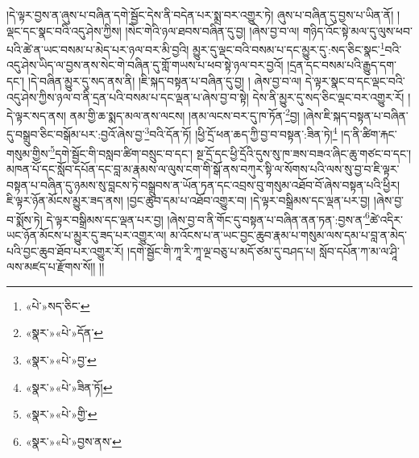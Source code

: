 །དེ་ལྟར་བྱས་ན་ཞུས་པ་བཞིན་དགེ་སྦྱོང་དེས་ནི་བདེན་པར་སྨྲ་བར་འགྱུར་ཏེ། ཞུས་པ་བཞིན་དུ་བྱས་པ་ཡིན་ནོ། །ལྡང་དང་སྣང་བའི་འདུ་ཤེས་ཀྱིས། །སེང་གེའི་ཉལ་ཐབས་བཞིན་དུ་བྱ། །ཞེས་བྱ་བ་ལ། གཉིད་འོང་སྟེ་མལ་དུ་ལུས་ཕབ་པའི་ཚེ་ན་ཡང་བསམ་པ་མེད་པར་ཉལ་བར་མི་བྱའི། མྱུར་དུ་ལྡང་བའི་བསམ་པ་དང་མྱུར་དུ་:སད་ཅིང་སྣང་\footnote{«པེ་»སད་ཅིང་}བའི་འདུ་ཤེས་ཡིད་ལ་བྱས་ནས་སེང་གེ་བཞིན་དུ་གློ་གཡས་པ་ཕབ་སྟེ་ཉལ་བར་བྱའོ། །དྲན་དང་བསམ་པའི་རྒྱུད་དག་དང་། །དེ་བཞིན་མྱུར་དུ་སད་ནས་ནི། །ཇི་སྐད་བསྟན་པ་བཞིན་དུ་བྱ། །
ཞེས་བྱ་བ་ལ། དེ་ལྟར་སྣང་བ་དང་ལྡང་བའི་འདུ་ཤེས་ཀྱིས་ཉལ་བ་ནི་དྲན་པའི་བསམ་པ་དང་ལྡན་པ་ཞེས་བྱ་བ་སྟེ། དེས་ནི་མྱུར་དུ་སད་ཅིང་ལྡང་བར་འགྱུར་རོ། །དེ་ལྟར་སད་ནས། ནམ་གྱི་ཆ་སྨད་མལ་ནས་ལངས། །ནམ་ལངས་བར་དུ་ཁ་ཏོན་\footnote{«སྣར་»«པེ་»དོན་}བྱ། །ཞེས་ཇི་སྐད་བསྟན་པ་བཞིན་དུ་བསྒྲུབ་ཅིང་བསྒོམ་པར་:བྱའོ་ཞེས་བྱ་\footnote{«སྣར་»«པེ་»བྱ་}བའི་དོན་ཏོ། །ཕྱི་དྲོ་ཕན་ཆད་ཀྱི་བྱ་བ་བསྟན་:ཟིན་ཏེ།\footnote{«སྣར་»«པེ་»ཟིན་ཏོ།} །ད་ནི་ཚིག་རྐང་གསུམ་གྱིས་\footnote{«སྣར་»«པེ་»གྱི་}དགེ་སྦྱོང་གི་བསླབ་ཚིག་བསྲུང་བ་དང་། སྔ་དྲོ་དང་ཕྱི་དྲོའི་དུས་སུ་ཁ་ཟས་བཟའ་ཞིང་ཆུ་གཙང་བ་དང་། མཁན་པོ་དང་སློབ་དཔོན་དང་བླ་མ་རྣམས་ལ་ལུས་ངག་གི་སྒོ་ནས་བཀུར་སྟི་ལ་སོགས་པའི་ལས་སུ་བྱ་བ་ཇི་ལྟར་བསྟན་པ་བཞིན་དུ་ཉམས་སུ་བླངས་ཏེ་བསྒྲུབས་ན་ཡོན་ཏན་དང་འབྲས་བུ་གསུམ་འཐོབ་བོ་ཞེས་བསྟན་པའི་ཕྱིར། ཇི་ལྟར་ཉོན་མོངས་མྱུར་ཟད་ནས། །བྱང་ཆུབ་དམ་པ་འཐོབ་འགྱུར་བ། །དེ་ལྟར་བསྒྲིམས་དང་ལྡན་པར་བྱ། །ཞེས་བྱ་བ་སྨོས་ཏེ། དེ་ལྟར་བསྒྲིམས་དང་ལྡན་པར་བྱ། །ཞེས་བྱ་བ་ནི་གོང་དུ་བསྟན་པ་བཞིན་ནན་ཏན་:བྱས་ན་\footnote{«སྣར་»«པེ་»བྱས་ནས་}ཚེ་འདིར་ཡང་ཉོན་མོངས་པ་མྱུར་དུ་ཟད་པར་འགྱུར་ལ། མ་འོངས་པ་ན་ཡང་བྱང་ཆུབ་རྣམ་པ་གསུམ་ལས་དམ་པ་བླ་ན་མེད་པའི་བྱང་ཆུབ་ཐོབ་པར་འགྱུར་རོ། །དགེ་སྦྱོང་གི་ཀཱ་རི་ཀཱ་ལྔ་བཅུ་པ་མདོ་ཙམ་དུ་བཤད་པ། སློབ་དཔོན་ཀ་མ་ལ་ཤཱི་ལས་མཛད་པ་རྫོགས་སོ།། །།